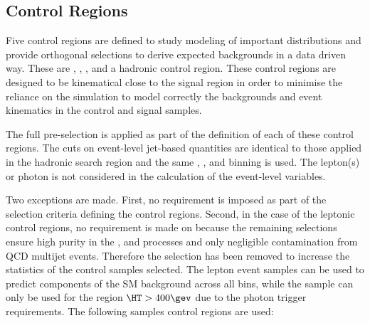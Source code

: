 \subsection{Control Regions}

Five control regions are defined to study modeling of important distributions and provide orthogonal selections to derive expected backgrounds in a data driven way.
These are \mj, \mmj, \gj, \eej and a hadronic control region. These control regions are designed to be kinematical close to the signal region in order to minimise the reliance on the simulation to model correctly the backgrounds and event kinematics in the control and signal samples.



The full pre-selection is applied as part of the definition of each of these control regions. The cuts on event-level jet-based quantities are identical to
those applied in the hadronic search region and the same \njet, \nb, and \scalht binning is used. The lepton(s) or photon is not considered in the calculation of the event-level variables. 

Two exceptions are made. First, no \bdphi requirement is imposed as part of the selection criteria defining the control regions. Second,
in the case of the leptonic control regions, no requirement is made on \alphat because the remaining selections ensure high purity in the \wj, \ttbar and \zll processes and only negligible  contamination from QCD multijet events. Therefore the \alphat selection has been removed to increase the statistics of the control samples selected. The lepton event samples can be used to predict components of the SM background across all \scalht bins, while the \gj sample can only be used for the region $\HT > 400\gev$ due to the photon trigger requirements. The following samples control regions are used:


